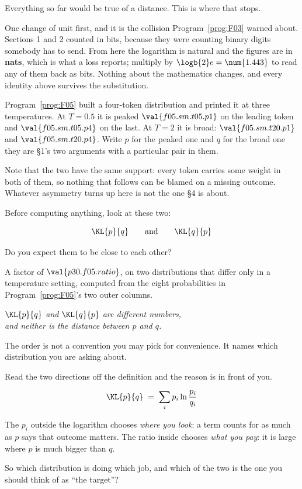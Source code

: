 \begin{fr}
Everything so far would be true of a distance. This is where that stops.

One change of unit first, and it is the collision Program~\ref{prog:F03}
warned about. Sections 1 and 2 counted in bits, because they were counting
binary digits somebody has to send. From here the logarithm is natural and
the figures are in \textbf{nats}, which is what a loss reports; multiply by
$\logb{2} e = \num{1.443}$ to read any of them back as bits. Nothing about
the mathematics changes, and every identity above survives the substitution.

Program~\ref{prog:F05} built a four-token distribution and printed it at
three temperatures. At $T = \num{0.5}$ it is peaked \dash{}
$\val{f05.sm.t05.p1}$ on the leading token and $\val{f05.sm.t05.p4}$ on the
last. At $T = 2$ it is broad: $\val{f05.sm.t20.p1}$ and
$\val{f05.sm.t20.p4}$. Write $p$ for the peaked one and $q$ for the broad
one \dash{} they are §1's two arguments with a particular pair in them.

Note that the two have the same support: every token carries some weight in
both of them, so nothing that follows can be blamed on a missing outcome.
Whatever asymmetry turns up here is not the one §4 is about.

Before computing anything, look at these two:

\[ \KL{p}{q} \qquad\text{and}\qquad \KL{q}{p} \]

Do you expect them to be close to each other?
\dotline
\nextframe
\end{fr}

\begin{fr}

A factor of $\val{p30.f05.ratio}$, on two distributions that differ only in a
temperature setting, computed from the eight probabilities in
Program~\ref{prog:F05}'s two outer columns.

\begin{center}
\emph{$\KL{p}{q}$ and $\KL{q}{p}$ are different numbers,\\
and neither is the distance between $p$ and $q$.}
\end{center}

The order is not a convention you may pick for convenience. It names which
distribution you are asking about.
\end{fr}

\begin{fr}
Read the two directions off the definition and the reason is in front of you.

\[ \KL{p}{q} \;=\; \sum_i p_i \ln\frac{p_i}{q_i} \]

The $p_i$ outside the logarithm chooses \emph{where you look}: a term counts
for as much as $p$ says that outcome matters. The ratio inside chooses
\emph{what you pay}: it is large where $p$ is much bigger than $q$.

So which distribution is doing which job, and which of the two is the one you
should think of as \enquote{the target}?
\dotline
\nextframe
\end{fr}

